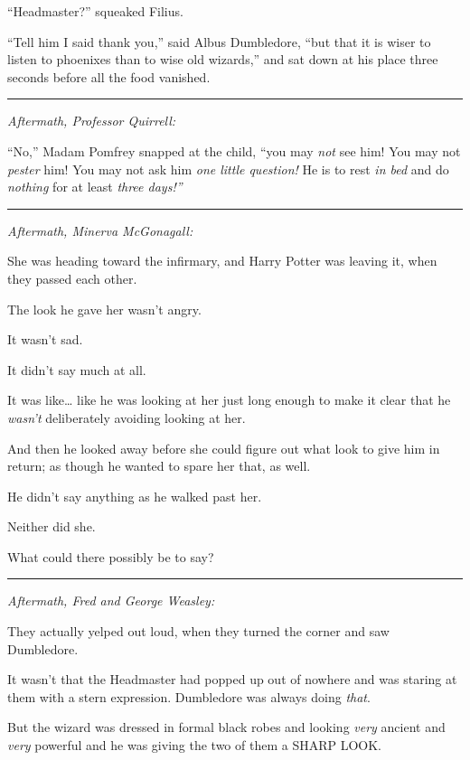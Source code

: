 ``Headmaster?'' squeaked Filius.

``Tell him I said thank you,'' said Albus Dumbledore, ``but that it is
wiser to listen to phoenixes than to wise old wizards,'' and sat down at
his place three seconds before all the food vanished.

\begin{center}\rule{3in}{0.4pt}\end{center}

\emph{Aftermath, Professor Quirrell:}

``No,'' Madam Pomfrey snapped at the child, ``you may \emph{not} see
him! You may not \emph{pester} him! You may not ask him \emph{one little
question!} He is to rest \emph{in bed} and do \emph{nothing} for at
least \emph{three days!''}

\begin{center}\rule{3in}{0.4pt}\end{center}

\emph{Aftermath, Minerva McGonagall:}

She was heading toward the infirmary, and Harry Potter was leaving it,
when they passed each other.

The look he gave her wasn't angry.

It wasn't sad.

It didn't say much at all.

It was like\ldots{} like he was looking at her just long enough to make
it clear that he \emph{wasn't} deliberately avoiding looking at her.

And then he looked away before she could figure out what look to give
him in return; as though he wanted to spare her that, as well.

He didn't say anything as he walked past her.

Neither did she.

What could there possibly be to say?

\begin{center}\rule{3in}{0.4pt}\end{center}

\emph{Aftermath, Fred and George Weasley:}

They actually yelped out loud, when they turned the corner and saw
Dumbledore.

It wasn't that the Headmaster had popped up out of nowhere and was
staring at them with a stern expression. Dumbledore was always doing
\emph{that}.

But the wizard was dressed in formal black robes and looking \emph{very}
ancient and \emph{very} powerful and he was giving the two of them a
SHARP LOOK.

